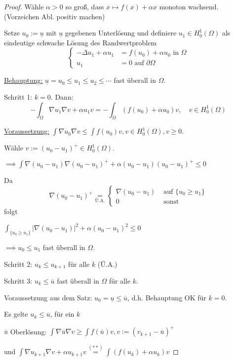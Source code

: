 \begin{proof}
  Wähle $\alpha > 0$ so groß, dass $x \mapsto f(x) + \alpha x$ monoton wachsend. (Vorzeichen Abl. positiv machen)

  Setze $u_0 := \underline u$ mit $\underline u$ gegebenen Unterlösung und definiere $u_1 \in H_0^1(\Omega)$ als eindeutige schwache Lösung des Randwertproblem
  $$
  \begin{cases}
    -\Delta u_1 + \alpha u_1 &= f(u_0) + \alpha u_0 \text{ in } \Omega \\
    u_1 &= 0 \text{ auf } \partial \Omega
  \end{cases}
  $$

  \underline{Behauptung:} $\underline u = u_0 \leq u_1 \leq u_2 \leq \cdots $ fast überall in $\Omega$.

  Schritt 1: $k = 0$. Dann:
  $$
  - \int_\Omega \nabla u_1 \nabla v + \alpha u_1 v = - \int_\Omega(f(u_0) + \alpha u_0) v, \quad v \in H_0^1(\Omega)
  $$

  \underline{Voraussetzung:} $\int \nabla u_0 \nabla v \leq \int f(u_0) v, v \in H_0^1(\Omega), v \geq 0$.

  Wähle $v := (u_0 - u_1)^+ \in H_0^1(\Omega)$.

  $\implies \int \nabla (u_0 - u_1) \nabla (u_0 - u_1)^+ + \alpha (u_0 - u_1)(u_0 - u_1)^+ \leq 0$

  Da $$\nabla(u_0 - u_1)^+ \underset{\text{Ü.A.}}{=} \begin{cases} \nabla(u_0 - u_1) & \text{ auf } \{u_0 \geq u_1\} \\ 0 & \text{ sonst}\end{cases}$$ folgt

  $\int_{\{u_0 \geq u_1\}} |\nabla(u_0 - u_1)|^2 + \alpha(u_0 - u_1)^2 \leq 0$

  $\implies u_0 \leq u_1$ fast überall in $\Omega$.

  Schritt 2: $u_k \leq u_{k + 1}$ für alle $k$ (Ü.A.)

  Schritt 3: $u_k \leq \overline u$ fast überall in $\Omega$ für alle $k$.

  Voraussetzung aus dem Satz: $u_0 = \underline u \leq \overline u$, d.h. Behauptung OK für $k = 0$.

  Es gelte $u_k \leq \overline u$, für ein $k$

  $\overline u$ Oberlösung: $\int \nabla \overline u \nabla v \geq \int f(\overline u) v, v := (v_{k + 1} - \overline u)^+$

  und $\int \nabla u_{k + 1} \nabla v + \alpha u_{k + 1} v \overset{(\ast \ast)}{=} \int (f(u_k) + \alpha u_k) v$


\end{proof}
